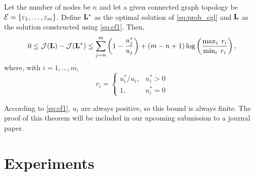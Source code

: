 \documentclass{article}
\begin{document}
\begin{theorem}
\label{thm:erbd}
Let the number of nodes be $n$ and let a given connected graph topology be ${\cal E}=\{\varepsilon_1,\dots,\varepsilon_m\}$. Define ${\bf L}^*$ as the optimal solution of \eqref{eq:prob_cgl} and ${\bf L}$ as the solution constructed using \eqref{eq:cf1}. Then, 
\begin{equation*}
  0\leq {\cal J}({\bf L})-{\cal J}({\bf L}^*)
  \leq \sum_{j=n}^m\left(1-\frac{u_j^*}{u_j}\right)+(m-n+1)\log\left(\frac{\max_i\; r_i}{\min_i\; r_i}\right),
\end{equation*}
where, with $i=1,\dots,m$,
\[
  r_i = \left\{\begin{array}{ll} u_i^*/u_i, & u_i^*>0 \\
  1, & u_i^*=0\end{array}\right.
\]
\end{theorem}
% 
% 
According to \eqref{eq:cf1}, $u_i$ are always positive, so this bound is always finite. The proof of this theorem will be included in our upcoming submission to a journal paper.


\section{Experiments}
\label{sec:experiments}

\end{document}
